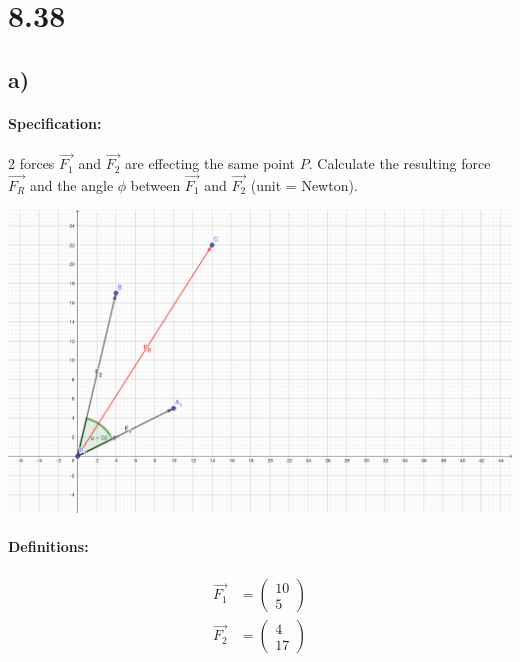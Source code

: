 \section{8.38}
\subsection{a)}

\paragraph{Specification:}
2 forces $\vec{F_1}$ and $\vec{F_2}$ are effecting the same point $P$. Calculate the resulting
force $\vec{F_R}$ and the angle $\phi$ between $\vec{F_1}$ and $\vec{F_2}$ (unit = Newton).

\includegraphics[width=\linewidth]{images/8-38.png}

\def\vFOne{\begin{pmatrix}
       10 \\ 
       5
    \end{pmatrix}}

\def\vFTwo{\begin{pmatrix}
       4 \\ 
       17
    \end{pmatrix}}

\def\vFR{\begin{pmatrix}
       14 \\ 
       22
    \end{pmatrix}}

\paragraph{Definitions:}
\begin{align}
    \vec{F_1} &= \vFOne \\
    \vec{F_2} &= \vFTwo
\end{align}

